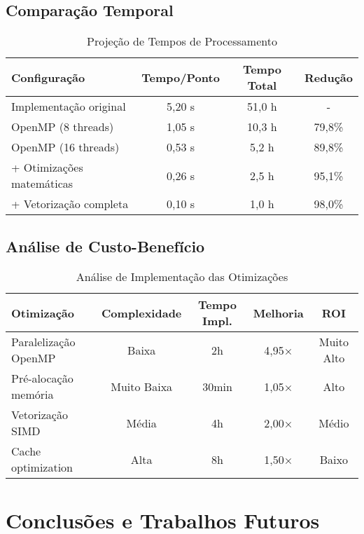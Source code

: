 \documentclass[12pt,a4paper]{article}
\begin{document}
\subsection{Comparação Temporal}

\begin{table}[H]
\centering
\caption{Projeção de Tempos de Processamento}
\begin{tabular}{@{}lccc@{}}
\toprule
\textbf{Configuração} & \textbf{Tempo/Ponto} & \textbf{Tempo Total} & \textbf{Redução} \\
\midrule
Implementação original & 5,20 s & 51,0 h & - \\
OpenMP (8 threads) & 1,05 s & 10,3 h & 79,8\% \\
OpenMP (16 threads) & 0,53 s & 5,2 h & 89,8\% \\
+ Otimizações matemáticas & 0,26 s & 2,5 h & 95,1\% \\
+ Vetorização completa & 0,10 s & 1,0 h & 98,0\% \\
\bottomrule
\end{tabular}
\end{table}

\subsection{Análise de Custo-Benefício}

\begin{table}[H]
\centering
\caption{Análise de Implementação das Otimizações}
\begin{tabular}{@{}lcccc@{}}
\toprule
\textbf{Otimização} & \textbf{Complexidade} & \textbf{Tempo Impl.} & \textbf{Melhoria} & \textbf{ROI} \\
\midrule
Paralelização OpenMP & Baixa & 2h & 4,95× & Muito Alto \\
Pré-alocação memória & Muito Baixa & 30min & 1,05× & Alto \\
Vetorização SIMD & Média & 4h & 2,00× & Médio \\
Cache optimization & Alta & 8h & 1,50× & Baixo \\
\bottomrule
\end{tabular}
\end{table}

\section{Conclusões e Trabalhos Futuros}
\end{document}
